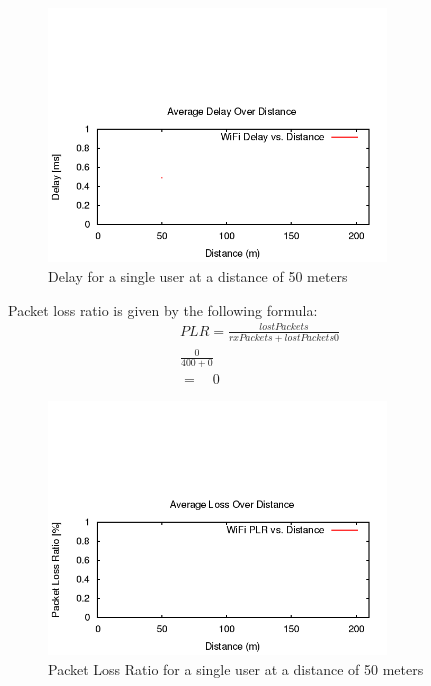 \begin{figure}[H]
	\centering
	\includegraphics[width=0.8\textwidth]{images/EE500/QA/P1/Images/wifi-Delay}
	\caption{Delay for a single user at a distance of 50 meters}
	\label{fig:QAdelay}
\end{figure}


Packet loss ratio is given by the following formula:
\begin{gather*}
	PLR = \frac{lostPackets}{rxPackets+lostPackets0} \\
	\frac{0}{400+0} \\
	= \quad 0
\end{gather*}

\begin{figure}[H]
	\centering
	\includegraphics[width=0.8\textwidth]{images/EE500/QA/P1/Images/wifi-loss}
	\caption{Packet Loss Ratio for a single user at a distance of 50 meters}
	\label{fig:QALoss}
\end{figure}
